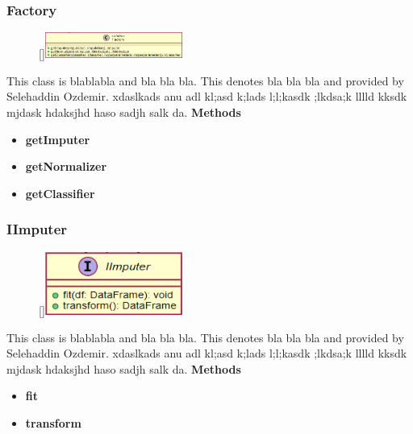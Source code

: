 \subsubsection{Factory}
\begin{figure}
    \raisebox{0pt}[\dimexpr{}\baselineskip\relax]{\includegraphics[width=4.5cm]{classes/model-management/8.png}}
\end{figure} 
\par
This class is blablabla and bla bla bla. This denotes bla bla bla and provided by Selehaddin Ozdemir. xdaslkads anu adl kl;asd k;lads l;l;kasdk ;lkdsa;k lllld kksdk mjdask hdaksjhd haso sadjh salk da.
\newline
\newline
\textbf{Methods}
\begin{itemize}
    \item \textbf{getImputer}
    \item \textbf{getNormalizer}
    \item \textbf{getClassifier}
\end{itemize}

\subsubsection{IImputer}
\begin{figure}
    \raisebox{0pt}[\dimexpr{}\baselineskip\relax]{\includegraphics[width=4.5cm]{classes/model-management/9.png}}
\end{figure} 
\par
This class is blablabla and bla bla bla. This denotes bla bla bla and provided by Selehaddin Ozdemir. xdaslkads anu adl kl;asd k;lads l;l;kasdk ;lkdsa;k lllld kksdk mjdask hdaksjhd haso sadjh salk da.
\newline
\newline
\textbf{Methods}
\begin{itemize}
    \item \textbf{fit}
    \item \textbf{transform}
\end{itemize}

